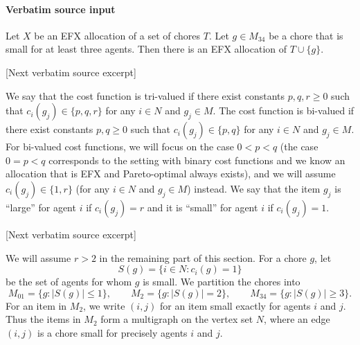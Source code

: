 \documentclass[10pt]{article}
\begin{document}
\paragraph{Verbatim source input}
\begin{ReviewVerbatim}
\begin{lemma}\label{lem:insertion}
Let $X$ be an EFX allocation of a set of chores $T$.  Let $g\in M_{34}$ be a
chore that is small for at least three agents.  Then there is an EFX
allocation of $T\cup\{g\}$.
\end{lemma}

[Next verbatim source excerpt]

We say that the cost function is tri-valued if there exist constants $p,q,r\geq 0$ such that $c_i(g_j)\in\{p,q,r\}$ for any $i\in N$ and $g_j\in M$.
The cost function is bi-valued if there exist constants $p,q\geq 0$ such that $c_i(g_j)\in\{p,q\}$ for any $i\in N$ and $g_j\in M$.
For bi-valued cost functions, we will focus on the case $0<p<q$ (the case $0=p<q$ corresponds to the setting with binary cost functions and we know an allocation that is EFX and Pareto-optimal always exists), and we will assume $c_i(g_j)\in\{1,r\}$ (for any $i\in N$ and $g_j\in M$) instead.
We say that the item $g_j$ is ``large'' for agent $i$ if $c_i(g_j)=r$ and it is ``small'' for agent $i$ if $c_i(g_j)=1$.

[Next verbatim source excerpt]

We will assume $r>2$ in the remaining part of this section.
For a chore $g$, let
\[
 S(g)=\{i\in N:c_i(g)=1\}
\]
be the set of agents for whom $g$ is small.  We partition the chores into
\[
M_{01}=\{g:|S(g)|\le 1\},\qquad
M_2=\{g:|S(g)|=2\},\qquad
M_{34}=\{g:|S(g)|\ge 3\}.
\]
For an item in $M_2$, we write $(i,j)$ for an item small exactly for agents
$i$ and $j$.  Thus the items in $M_2$ form a multigraph on the vertex set
$N$, where an edge $(i,j)$ is a chore small for precisely agents $i$ and $j$.
\end{ReviewVerbatim}
\end{document}
